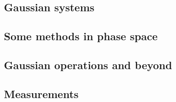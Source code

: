 
\subsection{Gaussian systems}\label{ssec:intro_cv_gaussianinfo}

\subsection{Some methods in phase space}\label{ssec:intro_cv_phase}


\subsection{Gaussian operations and beyond}\label{ssec:1_cv_channels}

\subsection{Measurements}\label{ssec:1_cv_measurements}

%
